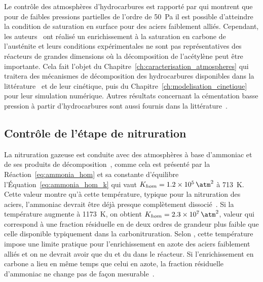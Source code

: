 Le contrôle des atmosphères d'hydrocarbures est rapporté par \citet{Yada2013} qui montrent que pour de faibles pressions partielles \textendash{} de l'ordre de \SI{50}{\pascal} \textendash{} il est possible d'atteindre la condition de saturation en surface pour des aciers faiblement alliés. Cependant, les auteurs~\cite{Yada2013} ont réalisé un enrichissement à la saturation en carbone de l'austénite et leurs conditions expérimentales ne sont pas représentatives des réacteurs de grandes dimensions où la décomposition de l'acétylène peut être importante. Cela fait l'objet du Chapitre~\ref{ch:caracterisation_atmospheres} qui traitera des mécanismes de décomposition des hydrocarbures disponibles dans la littérature~\cite{Benzinger1996957,Becker1998177,Becker1998201,Becker1998213, Becker1998225,Norinaga2005,Norinaga2007,Norinaga2007ii,Graf2007,Khan2008, Norinaga2009,Lacroix2010132,Gorockiewicz2011,Fau2013,Ziegler2005107,Ziegler2005212,Ziegler2005231,Ziegler2007268,Ziegler201348} et de leur cinétique, puis du Chapitre~\ref{ch:modelisation_cinetique} pour leur simulation numérique. Autres résultats concernant la cémentation basse pression à partir d'hydrocarbures sont aussi fournis dans la littérature~\citet{Tsuji1987,Liu2003,Iwata2005,Kula2005,Kula201326,Zajusz2014646}.

\subsection{Contrôle de l'étape de nitruration}
\label{sec:controle_nitruration}

La nitruration gazeuse est conduite avec des atmosphères à base d'ammoniac et de ses produits de décomposition~\cite{Slycke1981i,Ginter2006}, comme cela est présenté par la Réaction~\ref{eq:ammonia_hom} et sa constante d'équilibre~\cite{Stolen2004,Landau1980} \textendash{} l'Équation~\ref{eq:ammonia_hom_k} \textendash{} qui vaut $K_{hom}=\SI{1,2E5}{\square\atm}$ à \SI{713}{\kelvin}. Cette valeur montre qu'à cette température, typique pour la nitruration des aciers, l'ammoniac devrait être déjà presque complètement dissocié~\cite{Gantois2010}. Si la température augmente à \SI{1173}{\kelvin}, on obtient $K_{hom}=\SI{2,3E7}{\square\atm}$, valeur qui correspond à une fraction résiduelle en  de deux ordres de grandeur plus faible que celle disponible typiquement dans la carbonitruration. Selon \citet{Slycke1981i}, cette température impose une limite pratique pour l'enrichissement en azote des aciers faiblement alliés et on ne devrait avoir que du  et du  dans le réacteur. Si l'enrichissement en carbone a lieu en même temps que celui en azote, la fraction résiduelle d'ammoniac ne change pas de façon mesurable~\cite{Slycke1981i}.

